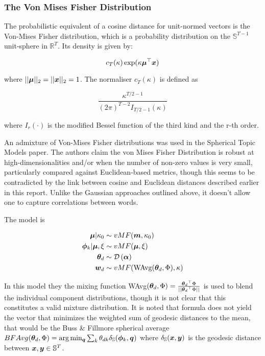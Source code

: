 \subsubsection*{The Von Mises Fisher Distribution}

The probabilistic equivalent of a cosine distance for unit-normed vectors is the Von-Mises Fisher distribution, which is a probability distribution on the $\mathbb{S}^{T-1}$ unit-sphere in $\mathbb{R}^{T}$. Its density is given by:

\begin{equation}
c_T(\kappa)\exp(\kappa \bm \mu^\top\bm x)
\end{equation}

where $||\bm \mu||_2 = ||\bm x||_2 = 1$. The normaliser $c_T(\kappa)$ is defined as

\begin{equation}
\frac{\kappa ^{T\!/\!2-1}}{(2\pi)^{T-2} I_{T\!/\!2-1}(\kappa)}
\end{equation}

where $I_r(\cdot)$ is the modified Bessel function of the third kind and the r-th order.


An admixture of Von-Mises Fisher distributions was used in the Spherical Topic Models paper\cite{Reisinger2010}. The authors claim the von Mises Fisher Distribution is robust at high-dimensionalities and/or when the number of non-zero values is very small, particularly compared against Euclidean-based metrics, though this seems to be contradicted by the link between cosine and Euclidean distances described earlier in this report. Unlike the Gaussian approaches outlined above, it doesn't allow one to capture correlations between words.

The model is

\begin{align}
\bm \mu | \kappa_0 & \sim  vMF(\bm m, \kappa_0) \\
\bm \phi_k | \bm \mu, \xi & \sim  vMF(\bm \mu, \xi) \\
{ \bm \theta_d } & \sim  \mathcal{D} \left( {\bm \alpha} \right) \\
{ \bm w_d } & \sim  vMF(\text{WAvg}({ \bm \theta_d }, \Phi), \kappa) 
\end{align}

In this model they the mixing function WAvg$({ \bm \theta_d }, \Phi) = \frac{{ \bm \theta_d }^\top\Phi}{||{ \bm \theta_d }^\top\Phi||}$ is used to blend the individual component distributions, though it is not clear that this constitutes a valid mixture distribution.  It is noted that formula does not yield the vector that minimizes the weighted sum of geodesic distances to the mean, that would be the  Buss \& Fillmore spherical average $BFAvg({ \bm \theta_d },\Phi) = \arg \min_{\bm q} \sum_k { \theta_{dk} } \delta_\mathbb{S}(\bm \phi_k, \bm q)$ where $\delta_\mathbb{S}(\bm x, \bm y)$ is the geodesic distance between $\bm x, \bm y \in \mathbb{S}^T$. 

